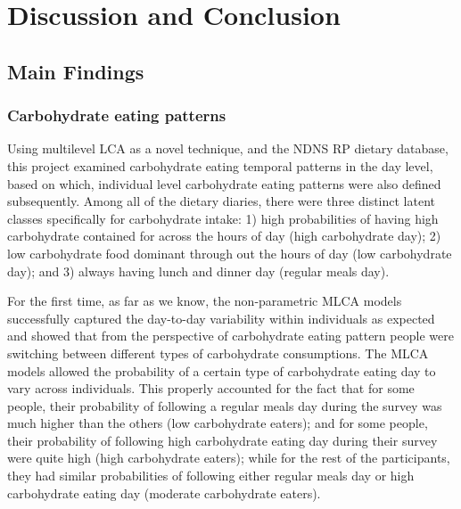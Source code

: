 
\chapter{Discussion and Conclusion} %

\label{Chapter 4} %






\section{Main Findings}

\subsection{Carbohydrate eating patterns}

Using multilevel LCA as a novel technique, and the NDNS RP dietary database, this project examined carbohydrate eating temporal patterns in the day level, based on which, individual level carbohydrate eating patterns were also defined subsequently. Among all of the dietary diaries, there were three distinct latent classes specifically for carbohydrate intake: 1) high probabilities of having high carbohydrate contained for across the hours of day (high carbohydrate day); 2) low carbohydrate food dominant through out the hours of day (low carbohydrate day); and 3) always having lunch and dinner day (regular meals day). 

For the first time, as far as we know, the non-parametric MLCA models successfully captured the day-to-day variability within individuals as expected and showed that from the perspective of carbohydrate eating pattern people were switching between different types of carbohydrate consumptions. The MLCA models allowed the probability of a certain type of carbohydrate eating day to vary across individuals. This properly accounted for the fact that for some people, their probability of following a regular meals day during the survey was much higher than the others (low carbohydrate eaters); and for some people, their probability of following high carbohydrate eating day during their survey were quite high (high carbohydrate eaters); while for the rest of the participants, they had similar probabilities of following either regular meals day or high carbohydrate eating day (moderate carbohydrate eaters). 




